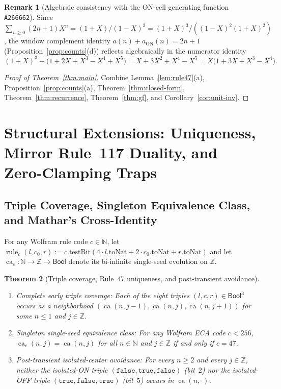 \documentclass[11pt]{article}
\newtheorem{theorem}{Theorem}[section]
\theoremstyle{definition}
\newtheorem{remark}[theorem]{Remark}
\newcommand{\N}{\mathbb{N}}
\newcommand{\Z}{\mathbb{Z}}
\newcommand{\seq}[1]{\texttt{#1}}
\newcommand{\ca}{\operatorname{ca}}
\begin{document}
\begin{remark}[Algebraic consistency with the ON-cell generating function \seq{A266662}]
Since $\sum_{n \ge 0} (2n + 1) X^n = (1 + X)/(1 - X)^2 = (1 + X)^3 / ((1 - X)^2(1 + X)^2)$, the window complement identity $a(n) + a_{\mathrm{ON}}(n) = 2n + 1$ (Proposition~\ref{prop:counts}(d)) reflects algebraically in the numerator identity
\[
(1 + X)^3 - \bigl(1 + 2X + X^3 - X^4 + X^5\bigr) = X + 3X^2 + X^4 - X^5 = X\bigl(1 + 3X + X^3 - X^4\bigr).
\]
\end{remark}

\begin{proof}[Proof of Theorem~\ref{thm:main}]
Combine Lemma~\ref{lem:rule47}(a), Proposition~\ref{prop:counts}(a), Theorem~\ref{thm:closed-form}, Theorem~\ref{thm:recurrence}, Theorem~\ref{thm:gf}, and Corollary~\ref{cor:unit-inv}.
\end{proof}

\section{Structural Extensions: Uniqueness, Mirror Rule~117 Duality, and Zero-Clamping Traps}
\label{sec:structure}

\subsection{Triple Coverage, Singleton Equivalence Class, and Mathar's Cross-Identity}

For any Wolfram rule code $c \in \N$, let $\operatorname{rule}_c(l, c_0, r) := c.\mathrm{testBit}(4 \cdot l.\mathrm{toNat} + 2 \cdot c_0.\mathrm{toNat} + r.\mathrm{toNat})$ and let $\ca_c : \N \to \Z \to \mathsf{Bool}$ denote its bi-infinite single-seed evolution on $\Z$.

\begin{theorem}[Triple coverage, Rule~47 uniqueness, and post-transient avoidance]
\label{thm:uniqueness}
\mbox{}
\begin{enumerate}
\item[\textup{(a)}] \emph{Complete early triple coverage:} Each of the eight triples $(l, c, r) \in \mathsf{Bool}^3$ occurs as a neighborhood $(\ca(n, j - 1),\allowbreak \ca(n, j),\allowbreak \ca(n, j + 1))$ for some $n \le 1$ and $j \in \Z$.
\item[\textup{(b)}] \emph{Singleton single-seed equivalence class:} For any Wolfram ECA code $c < 256$, $\ca_c(n, j) = \ca(n, j)$ for all $n \in \N$ and $j \in \Z$ if and only if $c = 47$.
\item[\textup{(c)}] \emph{Post-transient isolated-center avoidance:} For every $n \ge 2$ and every $j \in \Z$, neither the isolated-ON triple $(\mathtt{false}, \mathtt{true}, \mathtt{false})$ (bit~$2$) nor the isolated-OFF triple $(\mathtt{true}, \mathtt{false}, \mathtt{true})$ (bit~$5$) occurs in $\ca(n, \cdot)$.
\end{enumerate}
\end{theorem}
\end{document}
